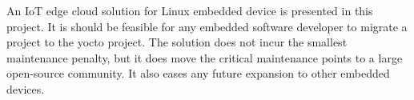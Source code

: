 \documentclass[../../main.tex]{subfiles}
\begin{document}
An IoT edge cloud solution for Linux embedded device is presented in this project.
It is should be feasible for any embedded software developer to migrate a project to the yocto
project.
The solution does not incur the smallest maintenance penalty, but it does move the critical 
maintenance points to a large open-source community.
It also eases any future expansion to other embedded devices.

	
\end{document}
